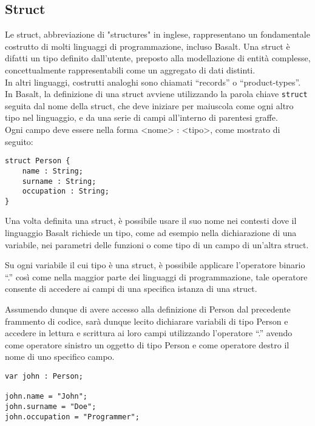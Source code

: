 \subsection{Struct}
Le struct, abbreviazione di "structures" in inglese, rappresentano un fondamentale costrutto di molti 
linguaggi di programmazione, incluso Basalt. Una struct è difatti un tipo definito dall’utente, preposto alla 
modellazione di entità complesse, concettualmente rappresentabili come un aggregato di dati distinti. \\

In altri linguaggi, costrutti analoghi sono chiamati “records” o “product-types”. \\

In Basalt, la definizione di una struct avviene utilizzando la parola chiave \texttt{struct} seguita dal nome della struct, 
che deve iniziare per maiuscola come ogni altro tipo nel linguaggio, e da una serie di campi all'interno di parentesi graffe. \\

Ogni campo deve essere nella forma <nome> : <tipo>, come mostrato di seguito:

\vspace{0.5cm}
\begin{lstlisting}[frame=single]
struct Person {
    name : String;
    surname : String;
    occupation : String;
}
\end{lstlisting}
\vspace{0.5cm}


Una volta definita una struct, è possibile usare il suo nome nei contesti dove il linguaggio Basalt richiede un tipo, come ad esempio nella dichiarazione di una variabile, 
nei parametri delle funzioni o come tipo di un campo di un’altra struct. 

Su ogni variabile il cui tipo è una struct, è possibile applicare l’operatore binario “.” così come nella maggior parte dei linguaggi di 
programmazione, tale operatore consente di accedere ai campi di una specifica istanza di una struct. 

Assumendo dunque di avere accesso alla definizione di Person dal precedente frammento di codice, sarà dunque 
lecito dichiarare variabili di tipo Person e accedere in lettura e scrittura ai loro campi utilizzando l’operatore “.” 
avendo come operatore sinistro un oggetto di tipo Person e come operatore destro il nome di uno specifico campo.

\vspace{0.5cm}
\begin{lstlisting}[frame=single]
var john : Person;

john.name = "John";
john.surname = "Doe";
john.occupation = "Programmer";
\end{lstlisting}
\vspace{0.5cm}

\newpage
 \newpage
 \newpage